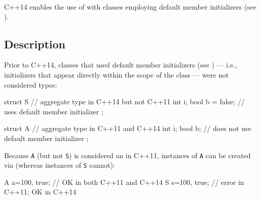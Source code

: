 

\setcounter{table}{0}
\setcounter{footnote}{0}
\setcounter{lstlisting}{0}


C++14 enables the use of  with classes
employing default member initializers (see ).

\subsection[Description]{Description}\label{description}

Prior to C++14, classes that used default member initializers (see ) --- i.e., initializers that appear directly within the
scope of the class --- were not considered  types:

\begin{emcppslisting}[language=C++]
struct S                // aggregate type in C++14 but not C++11
{
    int i;
    bool b = false;     // uses default member initializer
};

struct A                // aggregate type in C++11 and C++14
{
    int  i;
    bool b;             // does not use default member initializer
};
\end{emcppslisting}

\noindent Because \lstinline!A! (but not \lstinline!S!) is considered an  in
C++11, instances of \lstinline!A! can be created via  (whereas instances of \lstinline!S! cannot):

\begin{emcppslisting}[language=C++]
A a={100, true};  // OK in both C++11 and C++14
S s={100, true};  // error in C++11; OK in C++14
\end{emcppslisting}


